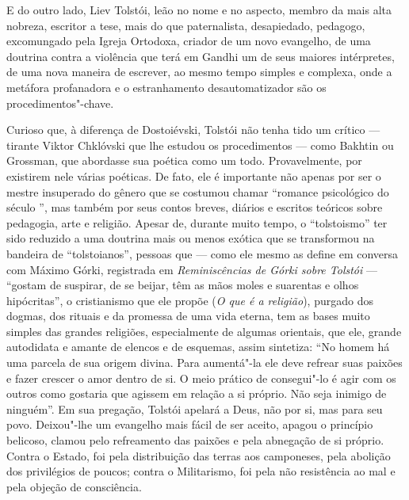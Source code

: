 E do outro lado, Liev Tolstói, leão no nome e no aspecto, membro da mais
alta nobreza, escritor a tese, mais do que paternalista, desapiedado, pedagogo, excomungado pela
Igreja Ortodoxa, criador de um novo evangelho, de uma doutrina contra a
violência que terá em Gandhi um de seus maiores intérpretes, de uma nova
maneira de escrever, ao mesmo tempo simples e complexa, onde a metáfora
profanadora e o estranhamento desautomatizador são os
procedimentos"-chave.

Curioso que, à diferença de Dostoiévski, Tolstói não
tenha tido um crítico --- tirante Viktor Chklóvski que lhe estudou os procedimentos --- como Bakhtin ou Grossman, que abordasse sua
poética como um todo. Provavelmente, por existirem nele várias poéticas. De fato, ele
é importante não apenas por ser o mestre insuperado do gênero que se
costumou chamar ``romance psicológico do século '', mas também por
seus contos breves, diários e escritos teóricos sobre pedagogia, arte e
religião. Apesar de, durante muito tempo, o ``tolstoismo'' ter sido
reduzido a uma doutrina mais ou menos exótica que se transformou na
bandeira de ``tolstoianos'', pessoas que --- como ele mesmo as define em
conversa com Máximo Górki, registrada em \emph{Reminiscências de Górki sobre Tolstói} --- ``gostam de suspirar, de se beijar, têm as
mãos moles e suarentas e olhos hipócritas'', o cristianismo que ele
propõe (\emph{O que é a religião}), purgado dos dogmas, dos rituais e da
promessa de uma vida eterna, tem as bases muito simples das grandes
religiões, especialmente de algumas orientais, que
ele, grande autodidata e amante de elencos e de esquemas, assim
sintetiza: ``No homem há uma parcela de sua origem divina. Para
aumentá"-la ele deve refrear suas paixões e fazer crescer o amor dentro
de si. O meio prático de consegui"-lo é agir com os outros como gostaria
que agissem em relação a si próprio. Não seja inimigo de ninguém''. Em
sua pregação, Tolstói apelará a Deus, não por si, mas para seu povo.
Deixou"-lhe um evangelho mais fácil de ser aceito, apagou o princípio
belicoso, clamou pelo refreamento das paixões e pela abnegação de si
próprio. Contra o Estado, foi pela distribuição das terras aos
camponeses, pela abolição dos privilégios de poucos; contra o
Militarismo, foi pela não resistência ao mal e pela objeção de
consciência.

